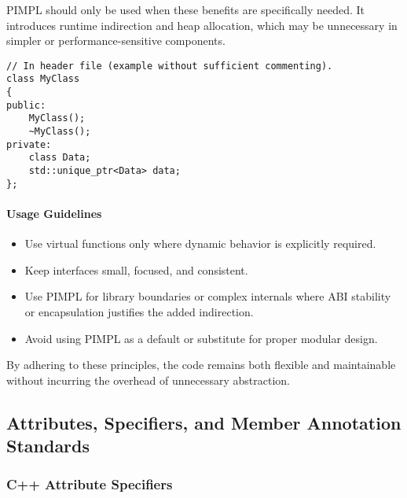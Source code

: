 PIMPL should only be used when these benefits are specifically needed. It introduces runtime indirection and heap allocation, which may be unnecessary in simpler or performance-sensitive components.
\begin{lstlisting}[style=cppstyle]
// In header file (example without sufficient commenting).
class MyClass 
{
public:
    MyClass();
    ~MyClass();
private:
    class Data;
    std::unique_ptr<Data> data;
};
\end{lstlisting}

\paragraph{Usage Guidelines}

\begin{itemize}
    \item Use virtual functions only where dynamic behavior is explicitly required.
    \item Keep interfaces small, focused, and consistent.
    \item Use PIMPL for library boundaries or complex internals where ABI stability or encapsulation justifies the added indirection.
    \item Avoid using PIMPL as a default or substitute for proper modular design.
\end{itemize}

By adhering to these principles, the code remains both flexible and maintainable without incurring the overhead of unnecessary abstraction.



\subsection{Attributes, Specifiers, and Member Annotation Standards}

\subsubsection*{C++ Attribute Specifiers}

